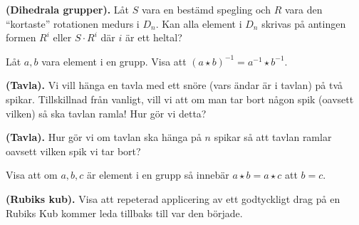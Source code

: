 \documentclass[11pt,fleqn]{book} %
\begin{document}
\begin{problem} \textbf{(Dihedrala grupper).}
  Låt \(S\) vara en bestämd spegling och \(R\) vara den ``kortaste'' rotationen medurs i \(D_n\). Kan alla element i \(D_n\) skrivas på antingen formen \(R ^i \) eller \(S  \cdot R ^{i}\) där \(i\) är ett heltal?
\end{problem}

\begin{problem} Låt \(a, b\) vara element i en grupp. Visa att \((a  \star b) ^{-1} = a ^{-1} \star b ^{-1}\).
\end{problem}

\begin{problem} \textbf{(Tavla).}
 Vi vill hänga en tavla med ett snöre (vars ändar är i tavlan) på två spikar. Tillskillnad från vanligt, vill vi att om man tar bort någon spik (oavsett vilken) så ska tavlan ramla! Hur gör vi detta? %
\end{problem}

\begin{problem} \textbf{(Tavla).}
  Hur gör vi om tavlan ska hänga på \(n\) spikar så att tavlan ramlar oavsett vilken spik vi tar bort?
\end{problem}

% 


\begin{problem}
  Visa att om \(a, b, c\) är element i en grupp så innebär \(a  \star b = a  \star c\) att \(b = c\).
\end{problem}

\begin{problem} \textbf{(Rubiks kub).}
  Visa att repeterad applicering av ett godtyckligt drag på en Rubiks Kub kommer leda tillbaks till var den började.
\end{problem}
\end{document}
